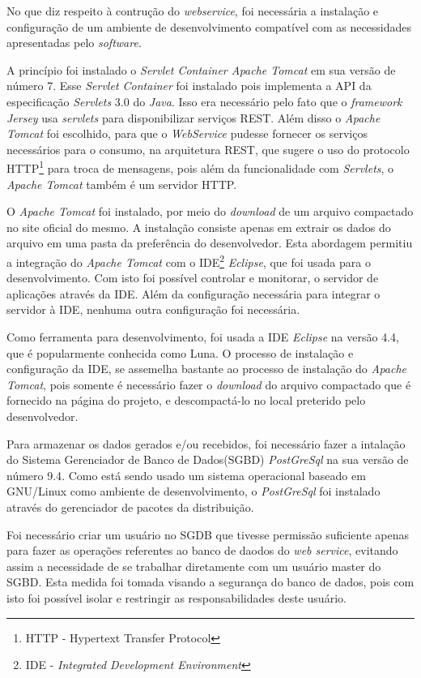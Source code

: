 	\par No que diz respeito à contrução do \textit{webservice}, foi necessária a
instalação e configuração de um ambiente de desenvolvimento compatível com as
necessidades apresentadas pelo \textit{software}. 

	\par A princípio foi instalado o \textit{Servlet Container Apache Tomcat} em
sua versão de número 7. Esse \textit{Servlet Container} foi instalado pois
implementa a API da especificação \textit{Servlets} 3.0 do \textit{Java}. Isso
era necessário pelo fato que o \textit{framework Jersey} usa \textit{servlets}
para disponibilizar serviços REST. Além disso o \textit{Apache Tomcat} foi
escolhido, para que o \textit{WebService} pudesse fornecer os serviços
necessários para o consumo, na arquitetura REST, que sugere o uso do protocolo
HTTP\footnote{HTTP - Hypertext Transfer Protocol} para troca de mensagens, pois
além da funcionalidade com \textit{Servlets}, o \textit{Apache Tomcat} também é
um servidor HTTP.
	
	\par O \textit{Apache Tomcat} foi instalado, por meio do \textit{download} de
um arquivo compactado no site oficial do mesmo. A instalação consiste apenas
em extrair os dados do arquivo em uma pasta da preferência do desenvolvedor.
Esta abordagem permitiu a integração do \textit{Apache Tomcat} com o
IDE\footnote{IDE - \textit{Integrated Development Environment}}
\textit{Eclipse}, que foi usada para o desenvolvimento. Com isto foi possível
controlar e monitorar, o servidor de aplicações através da IDE. Além da
configuração necessária para integrar o servidor à IDE, nenhuma outra
configuração foi necessária.

	\par Como ferramenta para desenvolvimento, foi usada a IDE \textit{Eclipse} na
versão {4.4}, que é popularmente conhecida como Luna. O processo de instalação
e configuração da IDE, se assemelha bastante ao processo de instalação do
\textit{Apache Tomcat}, pois somente é necessário fazer o \textit{download} do
arquivo compactado que é fornecido na página do projeto, e descompactá-lo no
local preterido pelo desenvolvedor.

	\par Para armazenar os dados gerados e/ou recebidos, foi necessário fazer a
intalação do Sistema Gerenciador de Banco de Dados(SGBD) \textit{PostGreSql} na
sua versão de número {9.4}. Como está sendo usado um sistema operacional
baseado em GNU/Linux como ambiente de desenvolvimento, o \textit{PostGreSql}
foi instalado através do gerenciador de pacotes da distribuição. 
 
	\par Foi necessário criar um usuário no SGDB que tivesse permissão suficiente
apenas para fazer as operações referentes ao banco de daodos do \textit{web
service}, evitando assim a necessidade de se trabalhar diretamente com um
usuário master do SGBD. Esta medida foi tomada visando a segurança do banco de
dados, pois com isto foi possível isolar e restringir as responsabilidades deste
usuário.
